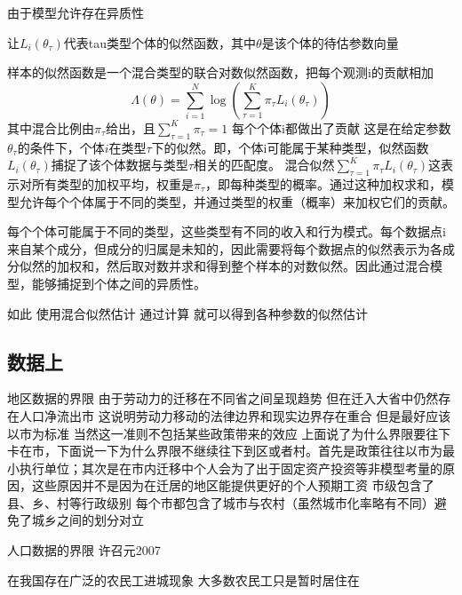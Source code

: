 \documentclass[10pt,a4paper]{article}
\begin{document}
由于模型允许存在异质性

让$L_{i}(\theta_{\tau})$代表tau类型个体的似然函数，其中$\theta$是该个体的待估参数向量

样本的似然函数是一个混合类型的联合对数似然函数，把每个观测i的贡献相加
\begin{equation}
\Lambda(\theta)=\sum\limits_{i=1}^{N}\log(\sum\limits_{\tau=1}^{K}\pi_{\tau}L_{i}(\theta_{\tau})) 
\end{equation}
其中混合比例由$\pi_{\tau}$给出，且$\sum\limits_{\tau=1}^{K}\pi_{\tau}=1$
每个个体i都做出了贡献
这是在给定参数$\theta_{\tau}$的条件下，个体$i$在类型$\tau$下的似然。即，个体i可能属于某种类型，似然函数
$L_i(\theta_{\tau})$捕捉了该个体数据与类型$\tau$相关的匹配度。
混合似然$\sum_{\tau=1}^{K} \pi_{\tau} L_i(\theta_{\tau})$这表示对所有类型的加权平均，权重是$\pi_{\tau}$，即每种类型的概率。通过这种加权求和，模型允许每个个体属于不同的类型，并通过类型的权重（概率）来加权它们的贡献。

每个个体可能属于不同的类型，这些类型有不同的收入和行为模式。每个数据点i来自某个成分，但成分的归属是未知的，因此需要将每个数据点的似然表示为各成分似然的加权和，然后取对数并求和得到整个样本的对数似然。因此通过混合模型，能够捕捉到个体之间的异质性。


如此
使用混合似然估计
通过计算
就可以得到各种参数的似然估计




\subsection{数据上}

地区数据的界限
由于劳动力的迁移在不同省之间呈现趋势 但在迁入大省中仍然存在人口净流出市 这说明劳动力移动的法律边界和现实边界存在重合 但是最好应该以市为标准 当然这一准则不包括某些政策带来的效应
上面说了为什么界限要往下卡在市，下面说一下为什么界限不继续往下到区或者村。首先是政策往往以市为最小执行单位；其次是在市内迁移中个人会为了出于固定资产投资等非模型考量的原因，这些原因并不是因为在迁居的地区能提供更好的个人预期工资
市级包含了县、乡、村等行政级别 每个市都包含了城市与农村（虽然城市化率略有不同）避免了城乡之间的划分对立


人口数据的界限
许召元2007

在我国存在广泛的农民工进城现象 大多数农民工只是暂时居住在
\end{document}
